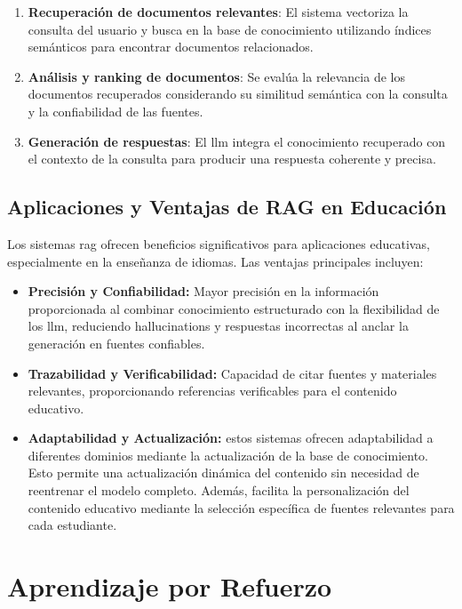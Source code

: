 \begin{enumerate}
  \item \textbf{Recuperación de documentos relevantes}: El sistema vectoriza la consulta del usuario y busca en la base de conocimiento utilizando índices semánticos para encontrar documentos relacionados.

  \item \textbf{Análisis y ranking de documentos}: Se evalúa la relevancia de los documentos recuperados considerando su similitud semántica con la consulta y la confiabilidad de las fuentes.

  \item \textbf{Generación de respuestas}: El \gls{llm} integra el conocimiento recuperado con el contexto de la consulta para producir una respuesta coherente y precisa.
\end{enumerate}

\subsection{Aplicaciones y Ventajas de RAG en Educación}

Los sistemas \gls{rag} ofrecen beneficios significativos para aplicaciones educativas, especialmente en la enseñanza de idiomas. Las ventajas principales incluyen:

\begin{itemize}
  \item \textbf{Precisión y Confiabilidad:} Mayor precisión en la información proporcionada al combinar conocimiento estructurado con la flexibilidad de los \gls{llm}, reduciendo \gls{hallucinations} y respuestas incorrectas al anclar la generación en fuentes confiables.

  \item \textbf{Trazabilidad y Verificabilidad:} Capacidad de citar fuentes y materiales relevantes, proporcionando referencias verificables para el contenido educativo.

  \item \textbf{Adaptabilidad y Actualización:} estos sistemas ofrecen adaptabilidad a diferentes dominios mediante la actualización de la base de conocimiento. Esto permite una actualización dinámica del contenido sin necesidad de reentrenar el modelo completo. Además, facilita la personalización del contenido educativo mediante la selección específica de fuentes relevantes para cada estudiante.
\end{itemize}

\section{Aprendizaje por Refuerzo}

